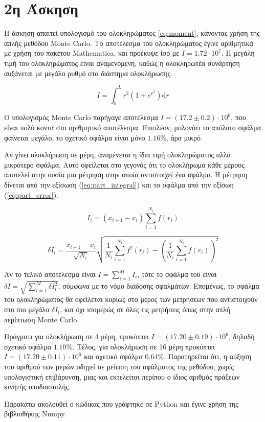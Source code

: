 \documentclass[assignment1.tex]{subfiles}
\begin{document}
\section*{2η Άσκηση}

Η άσκηση απαιτεί υπολογισμό του ολοκληρώματος \ref{eq:moment}, κάνοντας χρήση της απλής μεθόδου \textlatin{Monte Carlo}. Το αποτέλεσμα του ολοκληρώματος έγινε αριθμητικά με χρήση του πακέτου \textlatin{Mathematica}, και προέκυψε ίσο με $I=1.72\cdot10^7$. Η μεγάλη τιμή του ολοκληρώματος είναι αναμενόμενη, καθώς η ολοκληρωτέα συνάρτηση αυξάνεται με μεγάλο ρυθμό στο διάστημα ολοκλήρωσης.

\begin{equation}
I=\int_0^L r^2\left(1+e^{r^2}\right) \mathrm{d}r
\label{eq:moment}
\end{equation}


Ο υπολογισμός \textlatin{Monte Carlo} παρήγαγε αποτέλεσμα $I=(17.2 \pm 0.2)\cdot 10^6$, που είναι πολύ κοντά στο αριθμητικό αποτέλεσμα. Επιπλέον, μολονότι το απόλυτο σφάλμα φαίνεται μεγάλο, το σχετικό σφάλμα είναι μόνο $1.16\%$, άρα μικρό.

Αν γίνει ολοκλήρωση σε μέρη, αναμένεται η ίδια τιμή ολοκληρώματος αλλά μικρότερο σφάλμα. Αυτό οφείλεται στο γεγονός ότι το ολοκλήρωμα κάθε μέρους αποτελεί στην ουσία μια μέτρηση στην οποία αντιστοιχεί ένα σφάλμα. Η μέτρηση δίνεται από την εξίσωση (\ref{eq:part_integral}) και το σφάλμα από την εξίσωη (\ref{eq:part_error}). 

\begin{equation}
I_i = (x_{i+1}-x_i) \sum_{i=1}^{N_i} f(r_i) 
\label{eq:part_integral}
\end{equation}

\begin{equation}
\delta I_i = \frac{x_{i+1}-x_i}{\sqrt{N_i}} \sqrt{\frac{1}{N_i}\sum_{i=1}^{N_i} f^2(r_i) - \left( \frac{1}{N_i}\sum_{i=1}^{N_i} f(r_i) \right)^2}
\label{eq:part_error}
\end{equation}

Αν το τελικό αποτέλεσμα είναι $I=\sum_{i=1}^{M} I_i$, τότε το σφάλμα του είναι $\delta I = \sqrt{\sum_{i=1}^{M}\delta I_i^2}$, σύμφωνα με το νόμο διάδοσης σφαλμάτων. Επομένως, το σφάλμα του ολοκληρώματος θα οφείλεται κυρίως στο μέρος των μετρήσεων που αντιστοιχούν στο πιο μεγάλο $\delta I_i$, και όχι ισομερώς σε όλες τις μετρήσεις όπως στην απλή περίπτωση \textlatin{Monte Carlo}.


Πράγματι για ολοκλήρωση σε 4 μέρη, προκύπτει $I=(17.20 \pm 0.19)\cdot 10^6$, δηλαδή σχετικό σφάλμα $1.10\%$. Τέλος, για ολοκλήρωση σε 16 μέρη προκύπτει $I=(17.20 \pm 0.11)\cdot 10^6$ και σχετικό σφάλμα $0.64\%$. Παρατηρείται ότι, η αύξηση του αριθμού των μερών οδηγεί σε μείωση του σφάλματος της μεθόδου, χωρίς υπολογιστική επιβάρυνση, μιας και εκτελείται περίπου ο ίδιος αριθμός πράξεων κινητής υποδιαστολής.

Παρακάτω ακολουθεί ο κώδικας που γράφτηκε σε \textlatin{Python} και έγινε χρήση της βιβλιοθήκης \textlatin{Numpy}.


\end{document}
